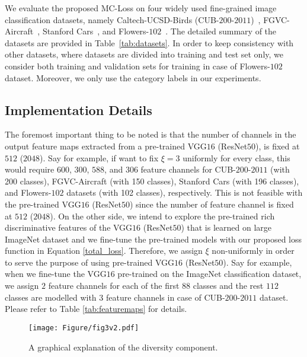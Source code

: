 \documentclass[journal]{IEEEtran}
\begin{document}
We evaluate the proposed MC-Loss on four widely used fine-grained image classification datasets, namely Caltech-UCSD-Birds (CUB-$200$-$2011$)~\cite{wah2011caltech}, FGVC-Aircraft~\cite{maji2013fine}, Stanford Cars~\cite{krause20133d}, and Flowers-$102$~\cite{nilsback2008automated}. The detailed summary of the datasets are provided in Table~\ref{tab:datasets}. In order to keep consistency with other datasets, where datasets are divided into training and test set only, we consider both training and validation sets for training in case of Flowers-$102$ dataset. Moreover, we only use the category labels in our experiments.











\subsection{Implementation Details}\label{Details}

The foremost important thing to be noted is that the number of channels in the output feature maps extracted from a pre-trained VGG$16$ (ResNet$50$), is fixed at $512$ ($2048$). Say for example, if want to fix $\xi = 3$ uniformly for every class, this would require $600$, $300$, $588$, and $306$ feature channels for CUB-$200$-$2011$ (with 200 classes), FGVC-Aircraft (with 150 classes),  Stanford Cars (with 196 classes), and Flowers-$102$ datasets (with 102 classes), respectively. This is not feasible with the pre-trained VGG$16$ (ResNet$50$) since the number of feature channel is fixed at $512$  ($2048$). On the other side, we intend to explore the pre-trained rich discriminative features of the VGG$16$ (ResNet$50$) that is learned on large ImageNet dataset and we fine-tune the pre-trained models with our proposed loss function in Equation \ref{total_loss}. Therefore, we assign $\xi$ non-uniformly in order to serve the purpose of using pre-trained VGG$16$  (ResNet$50$). Say for example, when we fine-tune the VGG$16$ pre-trained on the ImageNet classification dataset, we assign $2$ feature channels for each of the first $88$ classes and the rest $112$ classes are modelled with $3$ feature channels in case of CUB-$200$-$2011$ dataset. Please refer to Table \ref{tab:featuremaps} for details. 
 


\begin{figure}[!t]
  \begin{center}
    \texttt{[image: Figure/fig3v2.pdf]}
  \end{center}
  \caption{A graphical explanation of the diversity component.}
  \label{fig:explaindivloss}
\end{figure}
\end{document}
